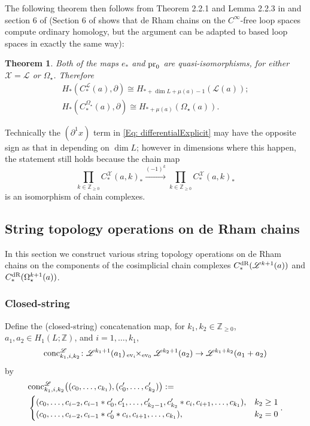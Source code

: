 \documentclass[10pt]{amsart}
\numberwithin{equation}{section}
\theoremstyle{plain}
\newtheorem{theorem}{Theorem}[section]
\theoremstyle{definition}
\theoremstyle{remark}
\numberwithin{equation}{section}
\newcommand{\Z}{\mathbb{Z}}
\newcommand{\ev}{\textup{ev}}
\newcommand{\mc}[1]{\mathcal{#1}}
\newcommand{\ms}[1]{\mathscr{#1}}
\newcommand{\dR}{\textup{dR}}
\newcommand{\fiberprod}[2]{\,_{#1}\!\!\times_{#2} }
\newcommand{\pr}{\textup{pr}}
\newcommand{\conc}{\textup{conc}^\mathscr{L}}
\newcommand{\CFr}{C_*^\mathscr{L}}
\newcommand{\CBa}{C_*^{\Omega_\star}}
\begin{document}
{The following theorem then follows from Theorem 2.2.1 and Lemma 2.2.3 in \cite{WangThesis} and section 6 of \cite{Irie1} (Section 6 of \cite{Irie1} shows that de Rham chains on the $C^\infty$-free loop spaces compute ordinary homology, but the argument can be adapted to based loop spaces in exactly the same way):
\begin{theorem}\label{Thm: cosimpHlgy}
	Both of the maps $e_*$ and $\pr_0$ are quasi-isomorphisms, for either $\mathcal{X} = \mathscr{L}$ or $\Omega_\star$.
	Therefore 
	\begin{gather*}
		H_*(\CFr(a), \partial) \cong H_{*+\dim L + \mu(a) -1}(\ms{L}(a));\\
		H_*(\CBa(a), \partial) \cong H_{*+ \mu(a)}(\Omega_\star(a)).
	\end{gather*}
\end{theorem}
Technically the $(\partial^1 x)$ term  in \eqref{Eq: differentialExplicit} may have the opposite sign as that in \cite{WangThesis} depending on $\dim L$; however in dimensions where this happen, the statement still holds because the chain map \[\prod_{k\in \Z_{\geq 0}} C_*^\mc{X}(a,k)_*\xrightarrow{(-1)^k}\prod_{k\in \Z_{\geq 0}} C_*^\mc{X}(a,k)_*\] is an isomorphism of chain complexes.





\subsection{String topology operations on de Rham chains}\label{Subsc: StringOper}
In this section we construct various string topology operations on de Rham chains on the components of the cosimplicial chain complexes $C_*^\dR(\ms{L}^{k+1}(a))$ and $C_*^\dR(\Omega_\star^{k+1}(a))$.
\subsubsection{Closed-string}
Define the (closed-string) concatenation map, for $k_1,k_2\in \Z_{\geq 0}$, $a_1,a_2\in H_1(L;\Z)$, and $i=1,\dots, k_1$, 
\[
	\conc_{k_1,i,k_2}\colon  \mathscr{L}^{k_1+1}(a_1) \fiberprod{\ev_i}{\ev_0} \mathscr{L}^{k_2+1}(a_2) \to \mathscr{L}^{k_1+k_2}(a_1+a_2)
\]
by 
	\begin{align*}
		&\conc_{k_1,i,k_2}\big((c_0,\dots, c_{k_1}), (c_0',\dots, c_{k_2}')\big) :=\\
		& \begin{cases}
			(c_0,\dots, c_{i-2}, c_{i-1}*c_0', c_1',\dots, c'_{k_2-1},c'_{k_2}* c_i, c_{i+1},\dots, c_{k_1}), & k_2\geq 1\\
			(c_0, \dots, c_{i-2}, c_{i-1}*c_0'*c_i,c_{i+1},\dots, c_{k_1}), & k_2=0
		\end{cases}.
	\end{align*}  
	
}
\end{document}
